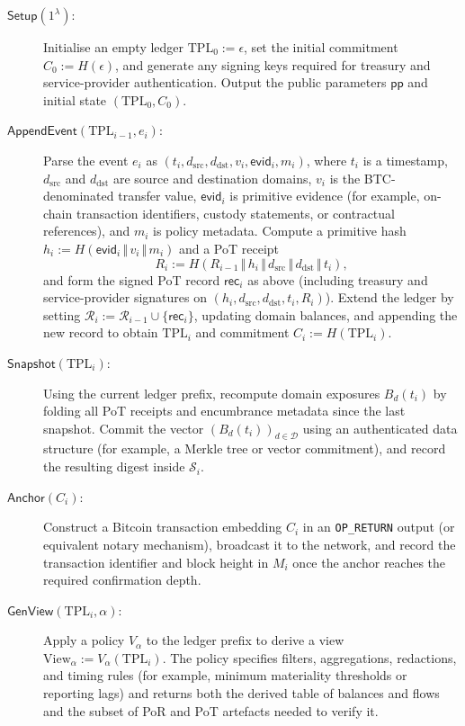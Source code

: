 \documentclass[11pt]{article}
\begin{document}
\begin{description}
  \item[$\mathsf{Setup}(1^\lambda)$:]
  Initialise an empty ledger $\mathrm{TPL}_0 := \epsilon$, set the initial commitment $C_0 := H(\epsilon)$, and generate any signing keys required for treasury and service-provider authentication. Output the public parameters $\mathsf{pp}$ and initial state $(\mathrm{TPL}_0, C_0)$.

  \item[$\mathsf{AppendEvent}(\mathrm{TPL}_{i-1}, e_i)$:]
  Parse the event $e_i$ as $(t_i, d_{\mathrm{src}}, d_{\mathrm{dst}}, v_i, \mathsf{evid}_i, m_i)$,
  where $t_i$ is a timestamp, $d_{\mathrm{src}}$ and $d_{\mathrm{dst}}$ are source and destination
  domains, $v_i$ is the BTC-denominated transfer value, $\mathsf{evid}_i$ is primitive evidence
  (for example, on-chain transaction identifiers, custody statements, or contractual references),
  and $m_i$ is policy metadata.
  Compute a primitive hash $h_i := H(\mathsf{evid}_i \,\Vert\, v_i \,\Vert\, m_i)$ and a PoT receipt
  \[
     R_i := H(R_{i-1} \,\Vert\, h_i \,\Vert\, d_{\mathrm{src}} \,\Vert\, d_{\mathrm{dst}} \,\Vert\, t_i),
  \]
  and form the signed PoT record $\mathsf{rec}_i$ as above (including treasury and service-provider signatures on $(h_i, d_{\mathrm{src}}, d_{\mathrm{dst}}, t_i, R_i)$).
  Extend the ledger by setting $\mathcal{R}_i := \mathcal{R}_{i-1} \cup \{\mathsf{rec}_i\}$, updating domain balances,
  and appending the new record to obtain $\mathrm{TPL}_i$ and commitment $C_i := H(\mathrm{TPL}_i)$.

  \item[$\mathsf{Snapshot}(\mathrm{TPL}_i)$:]
  Using the current ledger prefix, recompute domain exposures $B_d(t_i)$ by folding all PoT receipts and encumbrance metadata since the last snapshot.
  Commit the vector $(B_d(t_i))_{d\in\mathcal{D}}$ using an authenticated data structure (for example, a Merkle tree or vector commitment), and record the resulting digest inside $\mathcal{S}_i$.

  \item[$\mathsf{Anchor}(C_i)$:]
  Construct a Bitcoin transaction embedding $C_i$ in an \texttt{OP\_RETURN} output (or equivalent notary mechanism), broadcast it to the network, and record the transaction identifier and block height in $M_i$ once the anchor reaches the required confirmation depth.

  \item[$\mathsf{GenView}(\mathrm{TPL}_i,\alpha)$:]
  Apply a policy $V_\alpha$ to the ledger prefix to derive a view $\mathrm{View}_\alpha := V_\alpha(\mathrm{TPL}_i)$.
  The policy specifies filters, aggregations, redactions, and timing rules (for example, minimum materiality thresholds or reporting lags) and returns both the derived table of balances and flows and the subset of PoR and PoT artefacts needed to verify it.


\end{description}
\end{document}
